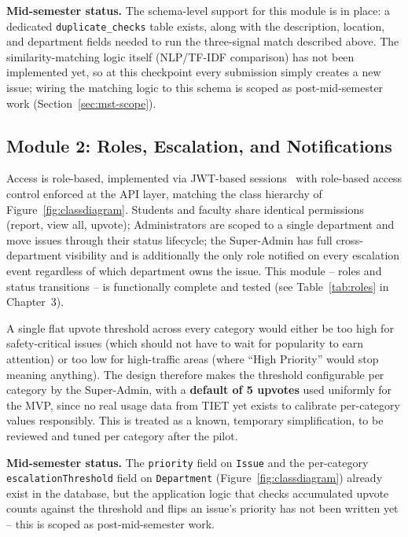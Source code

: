 \documentclass[11pt]{report}
\begin{document}
\textbf{Mid-semester status.} The schema-level support for this module
is in place: a dedicated \texttt{duplicate\_checks} table exists,
along with the description, location, and department fields needed to
run the three-signal match described above. The similarity-matching
logic itself (NLP/TF-IDF comparison) has not been implemented yet, so
at this checkpoint every submission simply creates a new issue; wiring
the matching logic to this schema is scoped as post-mid-semester work
(Section~\ref{sec:mst-scope}).

\subsection{Module 2: Roles, Escalation, and Notifications}

Access is role-based, implemented via JWT-based sessions~\cite{jwt2015}
with role-based access control enforced at the API layer, matching the class
hierarchy of Figure~\ref{fig:classdiagram}. Students and faculty share
identical permissions (report, view all, upvote); Administrators are
scoped to a single department and move issues through their status
lifecycle; the Super-Admin has full cross-department visibility and is
additionally the only role notified on every escalation event
regardless of which department owns the issue. This module -- roles and
status transitions -- is functionally complete and tested (see
Table~\ref{tab:roles} in Chapter~3).

A single flat upvote threshold across every category would either be
too high for safety-critical issues (which should not have to wait for
popularity to earn attention) or too low for high-traffic areas (where
``High Priority'' would stop meaning anything). The design therefore
makes the threshold configurable per category by the Super-Admin, with
a \textbf{default of 5 upvotes} used uniformly for the MVP, since no
real usage data from TIET yet exists to calibrate per-category values
responsibly. This is treated as a known, temporary simplification, to
be reviewed and tuned per category after the pilot.

\textbf{Mid-semester status.} The \texttt{priority} field on
\texttt{Issue} and the per-category \texttt{escalationThreshold} field
on \texttt{Department} (Figure~\ref{fig:classdiagram}) already exist in
the database, but the application logic that checks accumulated upvote
counts against the threshold and flips an issue's priority has not been
written yet -- this is scoped as post-mid-semester work.
\end{document}
